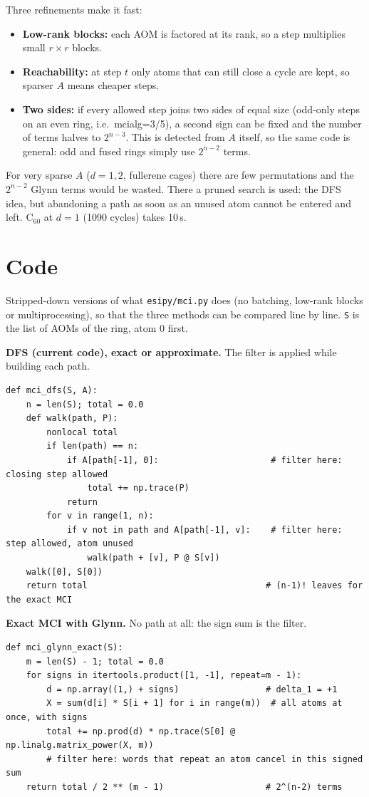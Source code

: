 \documentclass[11pt,a4paper]{article}
\begin{document}
Three refinements make it fast:
\begin{itemize}\itemsep0pt
\item \textbf{Low-rank blocks:} each AOM is factored at its rank, so a step multiplies small $r\times r$ blocks.
\item \textbf{Reachability:} at step $t$ only atoms that can still close a cycle are kept, so sparser $A$ means cheaper steps.
\item \textbf{Two sides:} if every allowed step joins two sides of equal size (odd-only steps on an even ring, i.e.\
      mcialg=3/5), a second sign can be fixed and the number of terms halves to $2^{n-3}$. This is detected from $A$
      itself, so the same code is general: odd and fused rings simply use $2^{n-2}$ terms.
\end{itemize}
For very sparse $A$ ($d=1,2$, fullerene cages) there are few permutations and the $2^{n-2}$ Glynn terms would be wasted.
There a pruned search is used: the DFS idea, but abandoning a path as soon as an unused atom cannot be entered and left.
C$_{60}$ at $d=1$ (1090 cycles) takes 10\,s.


\section{Code}
Stripped-down versions of what \texttt{esipy/mci.py} does (no batching, low-rank blocks or multiprocessing), so that the
three methods can be compared line by line. \texttt{S} is the list of AOMs of the ring, atom 0 first.

\textbf{DFS (current code), exact or approximate.} The filter is applied while building each path.
\begin{lstlisting}
def mci_dfs(S, A):
    n = len(S); total = 0.0
    def walk(path, P):
        nonlocal total
        if len(path) == n:
            if A[path[-1], 0]:                      # filter here: closing step allowed
                total += np.trace(P)
            return
        for v in range(1, n):
            if v not in path and A[path[-1], v]:    # filter here: step allowed, atom unused
                walk(path + [v], P @ S[v])
    walk([0], S[0])
    return total                                   # (n-1)! leaves for the exact MCI
\end{lstlisting}

\textbf{Exact MCI with Glynn.} No path at all: the sign sum is the filter.
\begin{lstlisting}
def mci_glynn_exact(S):
    m = len(S) - 1; total = 0.0
    for signs in itertools.product([1, -1], repeat=m - 1):
        d = np.array((1,) + signs)                 # delta_1 = +1
        X = sum(d[i] * S[i + 1] for i in range(m))  # all atoms at once, with signs
        total += np.prod(d) * np.trace(S[0] @ np.linalg.matrix_power(X, m))
        # filter here: words that repeat an atom cancel in this signed sum
    return total / 2 ** (m - 1)                    # 2^(n-2) terms
\end{lstlisting}
\end{document}
